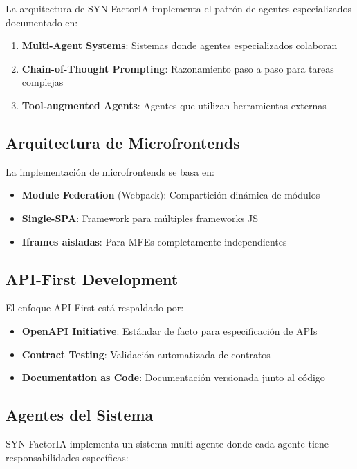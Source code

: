 \documentclass[12pt,a4paper,spanish]{article}
\begin{document}
La arquitectura de SYN FactorIA implementa el patrón de agentes especializados documentado en:

\begin{enumerate}
    \item \textbf{Multi-Agent Systems}: Sistemas donde agentes especializados colaboran
    \item \textbf{Chain-of-Thought Prompting}: Razonamiento paso a paso para tareas complejas
    \item \textbf{Tool-augmented Agents}: Agentes que utilizan herramientas externas
\end{enumerate}

\subsection{Arquitectura de Microfrontends}

La implementación de microfrontends se basa en:

\begin{itemize}
    \item \textbf{Module Federation} (Webpack): Compartición dinámica de módulos
    \item \textbf{Single-SPA}: Framework para múltiples frameworks JS
    \item \textbf{Iframes aisladas}: Para MFEs completamente independientes
\end{itemize}

\subsection{API-First Development}

El enfoque API-First está respaldado por:

\begin{itemize}
    \item \textbf{OpenAPI Initiative}: Estándar de facto para especificación de APIs
    \item \textbf{Contract Testing}: Validación automatizada de contratos
    \item \textbf{Documentation as Code}: Documentación versionada junto al código
\end{itemize}

\subsection{Agentes del Sistema}

SYN FactorIA implementa un sistema multi-agente donde cada agente tiene responsabilidades específicas:
\end{document}
